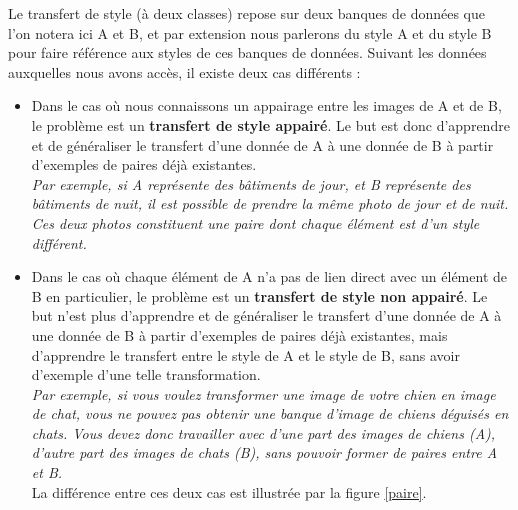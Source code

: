 Le transfert de style (à deux classes) repose sur deux banques de données que l'on notera ici A et B, et par extension nous parlerons du style A et du style B pour faire référence aux styles de ces banques de données. Suivant les données auxquelles nous avons accès, il existe deux cas différents :\\

\begin{itemize}
  \item Dans le cas où nous connaissons un appairage entre les images de A et de B, le problème est un \textbf{transfert de style appairé}. Le but est donc d'apprendre et de généraliser le transfert d'une donnée de A à une donnée de B à partir d'exemples de paires déjà existantes.\\
  \textit{Par exemple, si A représente des bâtiments de jour, et B représente des bâtiments de nuit, il est possible de prendre la même photo de jour et de nuit. Ces deux photos constituent une paire dont chaque élément est d'un style différent.}\\
  
  \item Dans le cas où chaque élément de A n'a pas de lien direct avec un élément de B en particulier, le problème est un \textbf{transfert de style non appairé}. Le but n'est plus d'apprendre et de généraliser le transfert d'une donnée de A à une donnée de B à partir d'exemples de paires déjà existantes, mais d'apprendre le transfert entre le style de A et le style de B, sans avoir d'exemple d'une telle transformation.\\
  \textit{Par exemple, si vous voulez transformer une image de votre chien en image de chat, vous ne pouvez pas obtenir une banque d'image de chiens déguisés en chats. Vous devez donc travailler avec d'une part des images de chiens (A), d'autre part des images de chats (B), sans pouvoir former de paires entre A et B.}\\
   La différence entre ces deux cas est illustrée par la figure \ref{paire}. 
\end{itemize}


